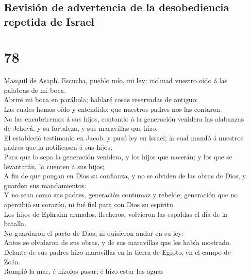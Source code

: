 \hypertarget{revisiuxf3n-de-advertencia-de-la-desobediencia-repetida-de-israel}{%
\subsection{Revisión de advertencia de la desobediencia repetida de
Israel}\label{revisiuxf3n-de-advertencia-de-la-desobediencia-repetida-de-israel}}

\hypertarget{section-77}{%
\section{78}\label{section-77}}

 Masquil de Asaph. Escucha, pueblo mío, mi ley: inclinad
vuestro oído á las palabras de mi boca.\\
 Abriré mi boca en parábola; hablaré cosas reservadas de
antiguo:\\
 Las cuales hemos oído y entendido; que nuestros padres
nos las contaron.\\
 No las encubriremos á sus hijos, contando á la generación
venidera las alabanzas de Jehová, y su fortaleza, y sus maravillas que
hizo.\\
 El estableció testimonio en Jacob, y pusó ley en Israel;
la cual mandó á nuestros padres que la notificasen á sus hijos;\\
 Para que lo sepa la generación venidera, y los hijos que
nacerán; y los que se levantarán, lo cuenten á sus hijos;\\
 A fin de que pongan en Dios su confianza, y no se olviden
de las obras de Dios, y guarden sus mandamientos:\\
 Y no sean como sus padres, generación contumaz y rebelde;
generación que no apercibió su corazón, ni fué fiel para con Dios su
espíritu.\\
 Los hijos de Ephraim armados, flecheros, volvieron las
espaldas el día de la batalla.\\
 No guardaron el pacto de Dios, ni quisieron andar en su
ley:\\
 Antes se olvidaron de sus obras, y de sus maravillas que
les había mostrado.\\
 Delante de sus padres hizo maravillas en la tierra de
Egipto, en el campo de Zoán.\\
 Rompió la mar, é hízolos pasar; é hizo estar las aguas
